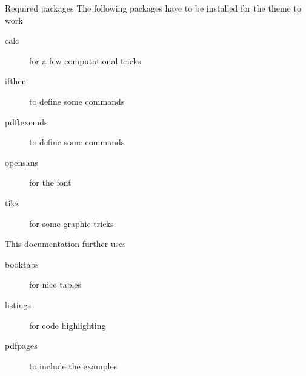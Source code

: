 \documentclass[aspectratio=169]{beamer}
\begin{document}
		\begin{frame}{Required packages}
			The following packages have to be installed for the theme to work
			\begin{description}
				\item[calc] for a few computational tricks
				\item[ifthen] to define some commands
				\item[pdftexcmds] to define some commands
				\item[opensans] for the font
				\item[tikz] for some graphic tricks
			\end{description}
			This documentation further uses
			\begin{description}
				\item[booktabs] for nice tables
				\item[listings] for code highlighting
				\item[pdfpages] to include the examples
			\end{description}
		\end{frame}
\end{document}
